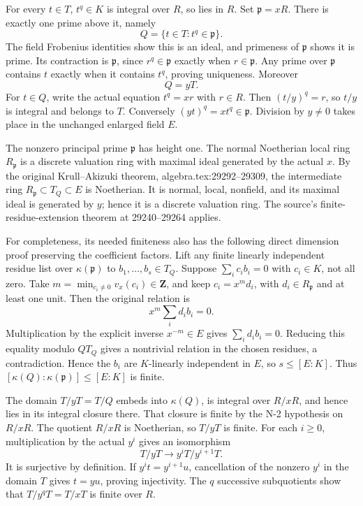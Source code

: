 For every \(t\in T\), \(t^q\in K\) is integral over \(R\), so lies in \(R\). Set \(\mathfrak p=xR\). There is exactly one prime above it, namely \[
 Q=\{t\in T:t^q\in\mathfrak p\}.
\] The field Frobenius identities show this is an ideal, and primeness of \(\mathfrak p\) shows it is prime. Its contraction is \(\mathfrak p\), since \(r^q\in\mathfrak p\) exactly when \(r\in\mathfrak p\). Any prime over \(\mathfrak p\) contains \(t\) exactly when it contains \(t^q\), proving uniqueness. Moreover \[
 Q=yT.
\] For \(t\in Q\), write the actual equation \(t^q=xr\) with \(r\in R\). Then \((t/y)^q=r\), so \(t/y\) is integral and belongs to \(T\). Conversely \((yt)^q=xt^q\in\mathfrak p\). Division by \(y\ne0\) takes place in the unchanged enlarged field \(E\).

The nonzero principal prime \(\mathfrak p\) has height one. The normal Noetherian local ring \(R_{\mathfrak p}\) is a discrete valuation ring with maximal ideal generated by the actual \(x\). By the original Krull--Akizuki theorem, algebra.\AlgebraIdentifierBreak{}tex:\AlgebraIdentifierBreak{}29292--\AlgebraIdentifierBreak{}29309, the intermediate ring \(R_{\mathfrak p}\subset T_Q\subset E\) is Noetherian. It is normal, local, nonfield, and its maximal ideal is generated by \(y\); hence it is a discrete valuation ring. The source's finite-residue-extension theorem at 29240--29264 applies.

For completeness, its needed finiteness also has the following direct dimension proof preserving the coefficient factors. Lift any finite linearly independent residue list over \(\kappa(\mathfrak p)\) to \(b_1,\ldots,b_s\in T_Q\). Suppose \(\sum_i c_i b_i=0\) with \(c_i\in K\), not all zero. Take \(m=\min_{c_i\ne0}v_x(c_i)\in\mathbf Z\), and keep \(c_i=x^m d_i\), with \(d_i\in R_{\mathfrak p}\) and at least one unit. Then the original relation is \[
 x^m\sum_i d_i b_i=0.
\] Multiplication by the explicit inverse \(x^{-m}\in E\) gives \(\sum_i d_i b_i=0\). Reducing this equality modulo \(Q T_Q\) gives a nontrivial relation in the chosen residues, a contradiction. Hence the \(b_i\) are \(K\)-linearly independent in \(E\), so \(s\leq[E:K]\). Thus \([\kappa(Q):\kappa(\mathfrak p)]\leq[E:K]\) is finite.

The domain \(T/yT=T/Q\) embeds into \(\kappa(Q)\), is integral over \(R/xR\), and hence lies in its integral closure there. That closure is finite by the N-2 hypothesis on \(R/xR\). The quotient \(R/xR\) is Noetherian, so \(T/yT\) is finite. For each \(i\geq0\), multiplication by the actual \(y^i\) gives an isomorphism \[
 T/yT\longrightarrow y^iT/y^{i+1}T.
\] It is surjective by definition. If \(y^i t=y^{i+1}u\), cancellation of the nonzero \(y^i\) in the domain \(T\) gives \(t=yu\), proving injectivity. The \(q\) successive subquotients show that \(T/y^qT=T/xT\) is finite over \(R\).

